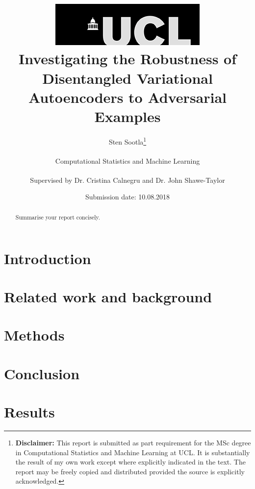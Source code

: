 \documentclass{report}
\title{  	{ \includegraphics[scale=.5,natwidth=294,natheight=84]{ucl_logo.png}}\\
{{\Huge Investigating the Robustness of Disentangled Variational Autoencoders to Adversarial Examples}}\\}
\date{Submission date: 10.08.2018}
\author{Sten Sootla\thanks{
{\bf Disclaimer:}
This report is submitted as part requirement for the MSc degree in Computational Statistics and Machine Learning at UCL. It is substantially the result of my own work except where explicitly indicated in the text. The report may be freely copied and distributed provided the source is explicitly acknowledged.}
\\ \\
Computational Statistics and Machine Learning\\ \\
Supervised by Dr. Cristina Calnegru and Dr. John Shawe-Taylor
}
\begin{document}
 
\onehalfspacing
\maketitle
\begin{abstract}
Summarise your report concisely.
\end{abstract}
\tableofcontents
\setcounter{page}{1}


\chapter{Introduction}

\chapter{Related work and background}

\chapter{Methods}

\chapter{Conclusion}
\chapter{Results}
\end{document}
